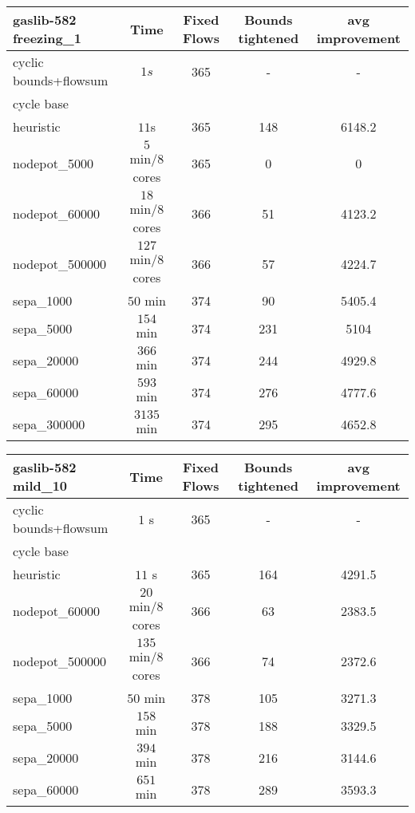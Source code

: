 \begin{center}
\begin{tabular}{ l | c | c | c | c }

\textbf{gaslib-582 freezing\_1} & Time  & Fixed Flows & Bounds tightened & avg improvement\\
\hline
 cyclic bounds+flowsum& $1s$ & 365 & - & - \\
 cycle base& $ $ &  &  & \\
 heuristic& $ 11$s& 365& 148 & 6148.2\\
 nodepot\_5000& $ 5$ min/8 cores & 365 & 0 & 0 \\ 
 nodepot\_60000& $18$ min/8 cores & 366 & 51 & 4123.2 \\ 
 nodepot\_500000& $127$ min/8 cores &366  & 57 & 4224.7 \\ 
 sepa\_1000& $50$ min & 374 & 90 & 5405.4 \\
 sepa\_5000& $ 154$ min & 374 & 231 & 5104  \\
 sepa\_20000& $366$ min & 374 & 244 & 4929.8 \\
 sepa\_60000& $593$ min & 374 & 276 & 4777.6\\
 sepa\_300000& $3135$ min & 374 & 295 & 4652.8\\
\end{tabular} 
\end{center}

\begin{center}
\begin{tabular}{ l | c | c | c | c }

\textbf{gaslib-582 mild\_10} & Time  & Fixed Flows & Bounds tightened & avg improvement\\
\hline
 cyclic bounds+flowsum& $1$ s& 365 & - & -\\
 cycle base& $ $ &  &  & \\
 heuristic& $11$ s& 365 & 164 & 4291.5\\
 nodepot\_60000& $20$ min/8 cores & 366 & 63 & 2383.5 \\ 
 nodepot\_500000& $135$ min/8 cores & 366 & 74 & 2372.6 \\ 
 sepa\_1000& $50$ min & 378 & 105 & 3271.3 \\
 sepa\_5000& $ 158$ min  & 378 & 188 & 3329.5 \\
 sepa\_20000& $ 394$ min & 378 & 216 &3144.6 \\
 sepa\_60000& $651$ min  & 378& 289 & 3593.3 \\
\end{tabular} 
\end{center}


